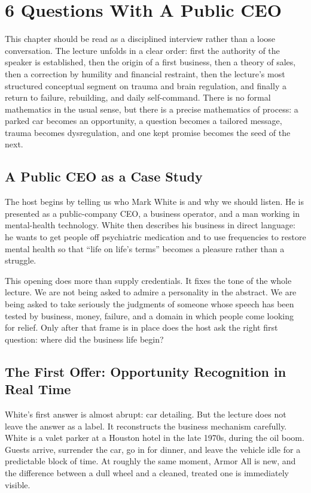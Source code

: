 \chapter{6 Questions With A Public CEO}

This chapter should be read as a disciplined interview rather than a loose conversation. The lecture unfolds in a clear order: first the authority of the speaker is established, then the origin of a first business, then a theory of sales, then a correction by humility and financial restraint, then the lecture's most structured conceptual segment on trauma and brain regulation, and finally a return to failure, rebuilding, and daily self-command. There is no formal mathematics in the usual sense, but there is a precise mathematics of process: a parked car becomes an opportunity, a question becomes a tailored message, trauma becomes dysregulation, and one kept promise becomes the seed of the next.

\section{A Public CEO as a Case Study}

The host begins by telling us who Mark White is and why we should listen. He is presented as a public-company CEO, a business operator, and a man working in mental-health technology. White then describes his business in direct language: he wants to get people off psychiatric medication and to use frequencies to restore mental health so that ``life on life's terms'' becomes a pleasure rather than a struggle.

This opening does more than supply credentials. It fixes the tone of the whole lecture. We are not being asked to admire a personality in the abstract. We are being asked to take seriously the judgments of someone whose speech has been tested by business, money, failure, and a domain in which people come looking for relief. Only after that frame is in place does the host ask the right first question: where did the business life begin?

\section{The First Offer: Opportunity Recognition in Real Time}

White's first answer is almost abrupt: car detailing. But the lecture does not leave the answer as a label. It reconstructs the business mechanism carefully. White is a valet parker at a Houston hotel in the late 1970s, during the oil boom. Guests arrive, surrender the car, go in for dinner, and leave the vehicle idle for a predictable block of time. At roughly the same moment, Armor All is new, and the difference between a dull wheel and a cleaned, treated one is immediately visible.

